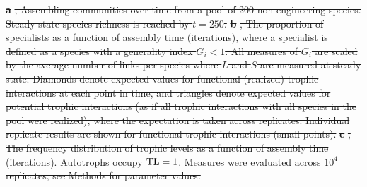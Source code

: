 \documentclass[twocolumn,preprintnumbers,amsmath,amssymb,superscriptaddress,linenumbers]{revtex4-1}
\providecommand{\DIFdel}[1]{{\protect\color{red}\sout{#1}}}                      %
\providecommand{\DIFdelbegin}{} %
\providecommand{\DIFdelFL}[1]{\DIFdel{#1}} %
\newcommand{\DIFscaledelfig}{0.5}
\newlength{\DIFdelgraphicswidth} %
\newlength{\DIFdelgraphicsheight} %
\newcommand{\DIFdelincludegraphics}[2][]{%
\sbox{\DIFdelgraphicsbox}{\DIFOincludegraphics[#1]{#2}}%
\settoboxwidth{\DIFdelgraphicswidth}{\DIFdelgraphicsbox} %
\settoboxtotalheight{\DIFdelgraphicsheight}{\DIFdelgraphicsbox} %
\scalebox{\DIFscaledelfig}{%
\parbox[b]{\DIFdelgraphicswidth}{\usebox{\DIFdelgraphicsbox}\\[-\baselineskip] \rule{\DIFdelgraphicswidth}{0em}}\llap{\resizebox{\DIFdelgraphicswidth}{\DIFdelgraphicsheight}{%
\setlength{\unitlength}{\DIFdelgraphicswidth}%
\begin{picture}(1,1)%
\thicklines\linethickness{2pt} %
{\color[rgb]{1,0,0}\put(0,0){\framebox(1,1){}}}%
{\color[rgb]{1,0,0}\put(0,0){\line( 1,1){1}}}%
{\color[rgb]{1,0,0}\put(0,1){\line(1,-1){1}}}%
\end{picture}%
}\hspace*{3pt}}} %
} %
\DeclareRobustCommand{\DIFdelbegin}{\DIFOdelbegin \let\includegraphics\DIFdelincludegraphics} %
\begin{document}
\DIFdelbegin %
{%
\textbf{\DIFdelFL{a}}%
\DIFdelFL{, Assembling communities over time from a pool of 200 non-engineering species. 
Steady state species richness is reached by $t=250$.
}\textbf{\DIFdelFL{b}}%
\DIFdelFL{, The proportion of specialists as a function of assembly time (iterations), where a specialist is defined as a species with a generality index $G_i < 1$.
All measures of $G_i$ are scaled by the average number of links per species where $L$ and $S$ are measured at steady state.
Diamonds denote expected values for functional (realized) trophic interactions at each point in time, and triangles denote expected values for potential trophic interactions (as if all trophic interactions with all species in the pool were realized), where the expectation is taken across replicates. Individual replicate results are shown for functional trophic interactions (small points).
}\textbf{\DIFdelFL{c}}%
\DIFdelFL{, The frequency distribution of trophic levels as a function of assembly time (iterations). 
Autotrophs occupy ${\rm TL}=1$.
Measures were evaluated across $10^4$ replicates; see Methods for parameter values.
}%
}
\end{document}

